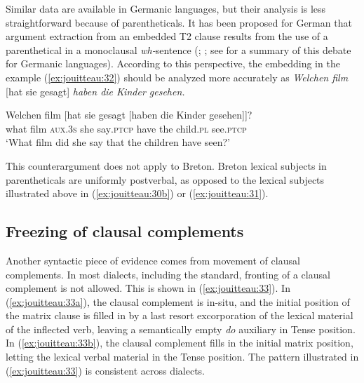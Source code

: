 \documentclass[output=paper,colorlinks,citecolor=brown]{langscibook}
\begin{document}
\noindent Similar data are available in Germanic languages, but their analysis is less straightforward because of parentheticals. It has been proposed for German that argument extraction from an embedded T2 clause results from the use of a parenthetical in a monoclausal \textit{wh-}sentence (\cite{mj:Reis1997}; \cite{mj:Reis2002}; see \cite{mj:Kiziak2010} for a summary of this debate for Germanic languages). According to this perspective, the embedding in the example (\ref{ex:jouitteau:32}) should be analyzed more accurately as \textit{Welchen film} [hat sie gesagt] \textit{haben die Kinder gesehen.} 

\ea \label{ex:jouitteau:32}
    \gll  Welchen film [hat  sie  gesagt [haben die  Kinder  gesehen]]?   \\
     what       film   \textsc{aux.3s}  she say\textsc{.ptcp}   have   the  child\textsc{.pl}         see\textsc{.ptcp}    \\
    \glt `What film did she say that the children have seen?’
    \z 
             
\noindent This counterargument does not apply to Breton. Breton lexical subjects in parentheticals are uniformly postverbal, as opposed to the lexical subjects illustrated above in (\ref{ex:jouitteau:30b}) or (\ref{ex:jouitteau:31}).

\subsection{Freezing of clausal complements}

Another syntactic piece of evidence comes from movement of clausal complements. In most dialects, including the standard, fronting of a clausal complement is not allowed. This is shown in (\ref{ex:jouitteau:33}). In (\ref{ex:jouitteau:33a}), the clausal complement is in-situ, and the initial position of the matrix clause is filled in by a last resort excorporation of the lexical material of the inflected verb, leaving a semantically empty \textit{do} auxiliary in Tense position. In (\ref{ex:jouitteau:33b}), the clausal complement fills in the initial matrix position, letting the lexical verbal material in the Tense position. The pattern illustrated in (\ref{ex:jouitteau:33}) is consistent across dialects.

\ea  \label{ex:jouitteau:33} 
\z
\z
\end{document}
